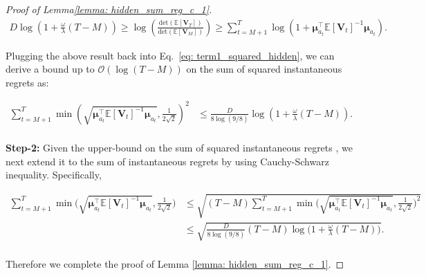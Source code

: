 \begin{proof}[Proof of Lemma\ref{lemma: hidden_sum_reg_c_1}]
\begin{equation}
\begin{aligned}
\label{eq: term1_log_sum_hidden}
D \log \left( 1 + \frac{\omega}{\lambda}(T-M) \right)
\geq 
\log \left( \frac{ \text{det} \left(\mathbb{E}[\boldsymbol{V}_{T}] \right) }{ \text{det} \left(\mathbb{E}[\boldsymbol{V}_{M}] \right)} \right) 
\geq
\sum_{t=M+1}^{T} 
\log \left(
1 + 
\boldsymbol{\mu}_{a_t}^{\top} \mathbb{E}[\boldsymbol{V}_t]^{-1} \boldsymbol{\mu}_{a_t}
\right).
\end{aligned}
\end{equation}

Plugging the above result back into Eq.~\ref{eq: term1_squared_hidden}, we can derive a bound up to $\mathcal{O}(\log(T-M))$ on the sum of squared instantaneous regrets as:

\begin{equation}
\begin{aligned}
\label{eq: term1_squared_upbd_hidden}
\sum_{t=M+1}^{T} \min \left( \sqrt{ \boldsymbol{\mu}_{a_t}^{\top} \mathbb{E}[\boldsymbol{V}_t]^{-1} \boldsymbol{\mu}_{a_t}}, \frac{1}{2\sqrt{2}} \right)^2 
& \leq 
\frac{D}{8 \log(9/8)} \log \left( 1 + \frac{\omega}{ \lambda}(T-M) \right). \\
\end{aligned}
\end{equation}

\textbf{Step-2:}
Given the upper-bound on the sum of squared instantaneous regrets , we next extend it to the sum of instantaneous regrets by using Cauchy-Schwarz inequality.
Specifically, 

\begin{equation}
\begin{aligned}
\sum_{t=M+1}^{T} \min \Big( \sqrt{ \boldsymbol{\mu}_{a_t}^{\top} \mathbb{E}[\boldsymbol{V}_t]^{-1} \boldsymbol{\mu}_{a_t}}, \frac{1}{2\sqrt{2}} \Big)
& \leq
\sqrt{(T-M) \sum_{t=M+1}^{T} \min \Big( \sqrt{ \boldsymbol{\mu}_{a_t}^{\top} \mathbb{E}[\boldsymbol{V}_t]^{-1} \boldsymbol{\mu}_{a_t}}, \frac{1}{2\sqrt{2}} \Big)^2 } \\
& \leq
\sqrt{\frac{D}{8 \log(9/8)} (T-M) \log \Big( 1 + \frac{\omega}{ \lambda}(T-M) \Big)}. \\
\end{aligned}
\end{equation}

Therefore we complete the proof of Lemma \ref{lemma: hidden_sum_reg_c_1}.  
\end{proof}


